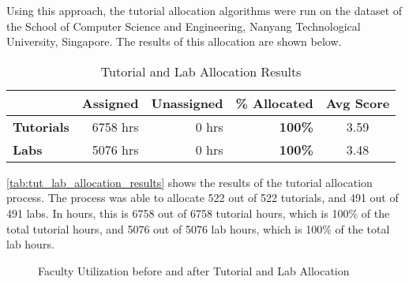 Using this approach, the tutorial allocation algorithms were run on the dataset of the School of Computer Science and Engineering, Nanyang Technological University, Singapore. The results of this allocation are shown below.

\begin{table}[ht]
  \centering
  \begin{tabular}{|l|r|r|r|c|}
    \hline
                       & \textbf{Assigned} & \textbf{Unassigned} & \textbf{\% Allocated} & \textbf{Avg Score} \\ \hline
    \textbf{Tutorials} & 6758 hrs          & 0 hrs               & \textbf{100\%}        & 3.59               \\ \hline
    \textbf{Labs}      & 5076 hrs          & 0 hrs               & \textbf{100\%}        & 3.48               \\ \hline
  \end{tabular}
  \caption{Tutorial and Lab Allocation Results}
  \label{tab:tut_lab_allocation_results}
\end{table}

\autoref{tab:tut_lab_allocation_results} shows the results of the tutorial allocation process. The process was able to allocate 522 out of 522 tutorials, and 491 out of 491 labs. In hours, this is 6758 out of 6758 tutorial hours, which is 100\% of the total tutorial hours, and 5076 out of 5076 lab hours, which is 100\% of the total lab hours.

\begin{figure}[H]
  \centering
  \caption{Faculty Utilization before and after Tutorial and Lab Allocation}
  \label{fig:tut_faculty_utilization}
\end{figure}

